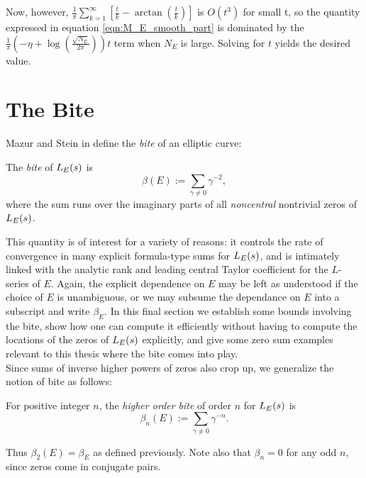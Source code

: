 Now, however, $\frac{1}{\pi}\sum_{k=1}^{\infty} \left[\frac{t}{k} - \arctan\left(\frac{t}{k}\right)\right]$ is $O(t^3)$ for small t, so the quantity expressed in equation \ref{eqn:M_E_smooth_part} is dominated by the $\frac{1}{\pi}\left(-\eta+\log\left(\frac{\sqrt{N_E}}{2\pi}\right)\right) t$ term when $N_E$ is large. Solving for $t$ yields the desired value.

\newpage
\section{The Bite}\label{sec:bite}

Mazur and Stein in \cite{MaSt-2013} define the {\it bite} of an elliptic curve:
\begin{definition}\label{defn:bite}
The {\it bite} of $L_E(s)$ is
\begin{equation}
\beta(E) := \sum_{\gamma \ne 0} \gamma^{-2},
\end{equation}
where the sum runs over the imaginary parts of all {\it noncentral} nontrivial zeros of $L_E(s)$.
\end{definition}
This quantity is of interest for a variety of reasons: it controls the rate of convergence in many explicit formula-type sums for $L_E(s)$, and is intimately linked with the analytic rank and leading central Taylor coefficient for the $L$-series of $E$. Again, the explicit dependence on $E$ may be left as understood if the choice of $E$ is unambiguous, or we may subsume the dependance on $E$ into a subscript and write $\beta_E$. In this final section we establish some bounds involving the bite, show how one can compute it efficiently without having to compute the locations of the zeros of $L_E(s)$ explicitly, and give some zero sum examples relevant to this thesis where the bite comes into play. \\

Since sums of inverse higher powers of zeros also crop up, we generalize the notion of bite as follows:
\begin{definition}
For positive integer $n$, the {\it higher order bite} of order $n$ for $L_E(s)$ is
\begin{equation}
\beta_n(E) := \sum_{\gamma \ne 0} \gamma^{-n}.
\end{equation}
\end{definition}
Thus $\beta_2(E) = \beta_E$ as defined previously. Note also that $\beta_n = 0$ for any odd $n$, since zeros come in conjugate pairs. \\


